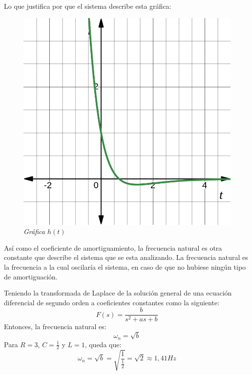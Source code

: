 \documentclass[12pt,a4paper]{report}
\begin{document}
\begin{enumerate}[label=\alph*)]
      Lo que justifica por que el sistema describe esta gráfica:
      \noindent
      \begin{figure}[h]
        \centering
        \begin{minipage}[h]{0.5\textwidth}
          \centering
          \includegraphics[width=1\textwidth]{./images/ej4.7.png}
          \textit{Gráfica $h(t)$}
        \end{minipage}
      \end{figure}

      Así como el coeficiente de amortiguamiento, la frecuencia natural es otra constante que describe el sistema que se
      esta analizando. La frecuencia natural es la frecuencia a la cual oscilaría el sistema, en caso de que no hubiese
      ningún tipo de amortiguación.

      Teniendo la transformada de Laplace de la solución general de una ecuación diferencial de segundo orden a
      coeficientes constantes como la siguiente:
      \begin{equation*}
        F(s) = \frac{b}{s^2+as+b}
      \end{equation*}
      Entonces, la frecuencia natural es:
      \begin{equation*}
        \omega_n = \sqrt{b}
      \end{equation*}
      Para $R = 3$, $C = \frac{1}{2}$ y $L = 1$, queda que:
      \begin{equation*}
        \omega_n = \sqrt{b} = \sqrt{\frac{1}{\frac{1}{2}}} = \sqrt{2} \approx 1,\!41 Hz
      \end{equation*}

  \end{enumerate}
\end{document}

